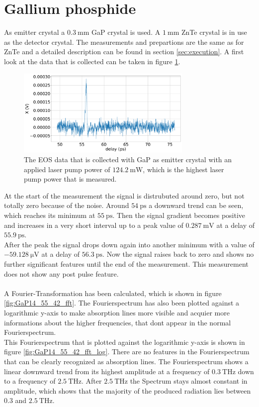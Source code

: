 \section{Gallium phosphide}
As emitter crystal a $\SI{0.3}{\milli\meter}$ GaP crystal is used.
A $\SI{1}{\milli\meter}$ ZnTe crystal is in use as the detector crystal.
The measurements and prepartions are the same as for ZnTe and a detailed description can be found in section \ref{sec:execution}.
A first look at the data that is collected can be taken in figure \ref{fig:GaP14_55_42normalX}.
\\
\begin{figure}
    \centering
    \includegraphics[width=0.75\textwidth]{Plots/GaP14_55_42normalX.pdf}
    \caption{The EOS data that is collected with GaP as emitter crystal with an applied laser pump power of $\SI{124.2}{\milli\W}$, which is the highest laser pump power that is measured.}
    \label{fig:GaP14_55_42normalX}
\end{figure}
At the start of the measurement the signal is distrubuted around zero, but not totally zero because of the noise.
Around $\SI{54}{\pico\second}$ a downward trend can be seen, which reaches its minimum at $\SI{55}{\pico\second}$.
Then the signal gradient becomes positive and increases in a very short interval up to a peak value of $\SI{0.287}{\milli\V}$ at a delay of $\SI{55.9}{\pico\second}$.
\\
After the peak the signal drops down again into another minimum with a value of $\SI{-59.128}{\micro\V}$ at a delay of $\SI{56.3}{\pico\second}$.
Now the signal raises back to zero and shows no further significant features until the end of the measurement.
This measurement does not show any post pulse feature.
\\\\
A Fourier-Transformation has been calculated, which is shown in figure \ref{fig:GaP14_55_42_fft}.
The Fourierspectrum has also been plotted against a logarithmic y-axis to make absorption lines more visible and acquier more informations about the higher frequencies, that dont appear in the normal Fourierspectrum.
\\
This Fourierspectrum that is plotted against the logarithmic y-axis is shown in figure \ref{fig:GaP14_55_42_fft_log}.
There are no features in the Fourierspectrum that can be clearly recognized as absorption lines.
The Fourierspectrum shows a linear downward trend from its highest amplitude at a frequency of $\SI{0.3}{\tera\hertz}$ down to a frequency of $\SI{2.5}{\tera\hertz}$.
After $\SI{2.5}{\tera\hertz}$ the Spectrum stays almost constant in amplitude, which shows that the majority of the produced radiation lies between $0.3$ and $\SI{2.5}{\tera\hertz}$.

